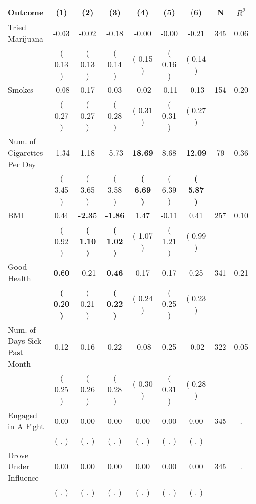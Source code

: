 \begin{tabular}{lcccccccc}
\toprule
 \textbf{Outcome} & \textbf{(1)} & \textbf{(2)} & \textbf{(3)} & \textbf{(4)} & \textbf{(5)} & \textbf{(6)} & \textbf{N} & \textbf{$ R^2$} \\
\midrule
Tried Marijuana &     -0.03 &     -0.02 &     -0.18 &     -0.00 &     -0.00 &     -0.21 & 345 &       0.06 \\ 
 & (     0.13 ) & (     0.13 ) & (     0.14 ) & (     0.15 ) & (     0.16 ) & (     0.14 ) & \\
Smokes &     -0.08 &      0.17 &      0.03 &     -0.02 &     -0.11 &     -0.13 & 154 &       0.20 \\ 
 & (     0.27 ) & (     0.27 ) & (     0.28 ) & (     0.31 ) & (     0.31 ) & (     0.27 ) & \\
Num. of Cigarettes Per Day &     -1.34 &      1.18 &     -5.73 & \textbf{    18.69} &      8.68 & \textbf{    12.09} & 79 &       0.36 \\ 
 & (     3.45 ) & (     3.65 ) & (     3.58 ) & \textbf{(     6.69 )} & (     6.39 ) & \textbf{(     5.87 )} & \\
BMI &      0.44 & \textbf{    -2.35} & \textbf{    -1.86} &      1.47 &     -0.11 &      0.41 & 257 &       0.10 \\ 
 & (     0.92 ) & \textbf{(     1.10 )} & \textbf{(     1.02 )} & (     1.07 ) & (     1.21 ) & (     0.99 ) & \\
Good Health & \textbf{     0.60} &     -0.21 & \textbf{     0.46} &      0.17 &      0.17 &      0.25 & 341 &       0.21 \\ 
 & \textbf{(     0.20 )} & (     0.21 ) & \textbf{(     0.22 )} & (     0.24 ) & (     0.25 ) & (     0.23 ) & \\
Num. of Days Sick Past Month &      0.12 &      0.16 &      0.22 &     -0.08 &      0.25 &     -0.02 & 322 &       0.05 \\ 
 & (     0.25 ) & (     0.26 ) & (     0.28 ) & (     0.30 ) & (     0.31 ) & (     0.28 ) & \\
Engaged in A Fight &      0.00 &      0.00 &      0.00 &      0.00 &      0.00 &      0.00 & 345 &          . \\ 
 & (        . ) & (        . ) & (        . ) & (        . ) & (        . ) & (        . ) & \\
Drove Under Influence &      0.00 &      0.00 &      0.00 &      0.00 &      0.00 &      0.00 & 345 &          . \\ 
 & (        . ) & (        . ) & (        . ) & (        . ) & (        . ) & (        . ) & \\

\end{tabular}
